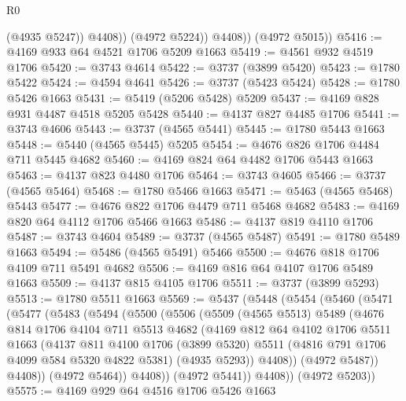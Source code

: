 \begin{lexlean}{R0}
\begin{coremodule}
                  (@4935 @5247))
                @4408))
            (@4972 @5224))
          @4408))
      (@4972 @5015))
@5416 := @4169 @933 @64 @4521 @1706 @5209 @1663
@5419 := @4561 @932 @4519 @1706
@5420 := @3743 @4614
@5422 := @3737 (@3899 @5420)
@5423 := @1780 @5422
@5424 := @4594 @4641
@5426 := @3737 (@5423 @5424)
@5428 := @1780 @5426 @1663
@5431 := @5419 (@5206 @5428) @5209
@5437 := @4169 @828 @931 @4487 @4518 @5205 @5428
@5440 := @4137 @827 @4485 @1706
@5441 := @3743 @4606
@5443 := @3737 (@4565 @5441)
@5445 := @1780 @5443 @1663
@5448 := @5440 (@4565 @5445) @5205
@5454 := @4676 @826 @1706 @4484 @711 @5445 @4682
@5460 := @4169 @824 @64 @4482 @1706 @5443 @1663
@5463 := @4137 @823 @4480 @1706
@5464 := @3743 @4605
@5466 := @3737 (@4565 @5464)
@5468 := @1780 @5466 @1663
@5471 := @5463 (@4565 @5468) @5443
@5477 := @4676 @822 @1706 @4479 @711 @5468 @4682
@5483 := @4169 @820 @64 @4112 @1706 @5466 @1663
@5486 := @4137 @819 @4110 @1706
@5487 := @3743 @4604
@5489 := @3737 (@4565 @5487)
@5491 := @1780 @5489 @1663
@5494 := @5486 (@4565 @5491) @5466
@5500 := @4676 @818 @1706 @4109 @711 @5491 @4682
@5506 := @4169 @816 @64 @4107 @1706 @5489 @1663
@5509 := @4137 @815 @4105 @1706
@5511 := @3737 (@3899 @5293)
@5513 := @1780 @5511 @1663
@5569 := @5437
    (@5448
      (@5454
        (@5460
          (@5471
            (@5477
              (@5483
                (@5494
                  (@5500
                    (@5506
                      (@5509
                        (@4565 @5513)
                        @5489
                        (@4676
                          @814
                          @1706
                          @4104
                          @711
                          @5513
                          @4682
                          (@4169
                            @812
                            @64
                            @4102
                            @1706
                            @5511
                            @1663
                            (@4137
                              @811
                              @4100
                              @1706
                              (@3899 @5320)
                              @5511
                              (@4816 @791 @1706 @4099 @584 @5320 @4822 @5381)
                              (@4935 @5293))
                            @4408))
                        (@4972 @5487))
                      @4408))
                  (@4972 @5464))
                @4408))
            (@4972 @5441))
          @4408))
      (@4972 @5203))
@5575 := @4169 @929 @64 @4516 @1706 @5426 @1663

\end{coremodule}
\end{lexlean}
